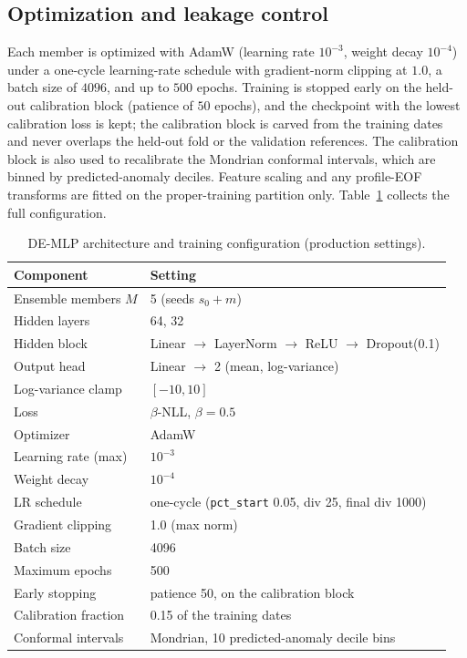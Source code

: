 \subsection{Optimization and leakage control}

Each member is optimized with AdamW (learning rate $10^{-3}$, weight decay
$10^{-4}$) under a one-cycle learning-rate schedule with gradient-norm clipping
at $1.0$, a batch size of $4096$, and up to $500$ epochs. Training is stopped
early on the held-out calibration block (patience of $50$ epochs), and the
checkpoint with the lowest calibration loss is kept; the calibration block is
carved from the training dates and never overlaps the held-out fold or the
validation references. The calibration block is also used to recalibrate the
Mondrian conformal intervals, which are binned by predicted-anomaly deciles.
Feature scaling and any profile-EOF transforms are fitted on the proper-training
partition only. Table~\ref{tab:hyperparams} collects the full configuration.

\begin{table}[t]
\centering
\caption{DE-MLP architecture and training configuration (production settings).}
\label{tab:hyperparams}
\begin{tabular}{@{}ll@{}}
\toprule
Component & Setting \\
\midrule
Ensemble members $M$        & 5 (seeds $s_0 + m$) \\
Hidden layers               & 64, 32 \\
Hidden block                & Linear $\to$ LayerNorm $\to$ ReLU $\to$ Dropout(0.1) \\
Output head                 & Linear $\to$ 2 (mean, log-variance) \\
Log-variance clamp          & $[-10, 10]$ \\
Loss                        & $\beta$-NLL, $\beta = 0.5$ \\
Optimizer                   & AdamW \\
Learning rate (max)         & $10^{-3}$ \\
Weight decay                & $10^{-4}$ \\
LR schedule                 & one-cycle (\texttt{pct\_start} 0.05, div 25, final div 1000) \\
Gradient clipping           & 1.0 (max norm) \\
Batch size                  & 4096 \\
Maximum epochs              & 500 \\
Early stopping              & patience 50, on the calibration block \\
Calibration fraction        & 0.15 of the training dates \\
Conformal intervals         & Mondrian, 10 predicted-anomaly decile bins \\
\bottomrule
\end{tabular}
\end{table}
